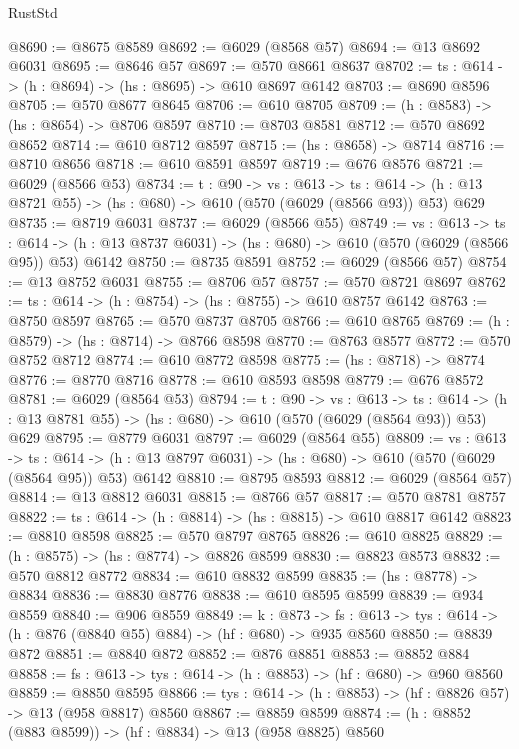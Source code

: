 \begin{lexlean}{RustStd}
\begin{coremodule}
@8690 := @8675 @8589
@8692 := @6029 (@8568 @57)
@8694 := @13 @8692 @6031
@8695 := @8646 @57
@8697 := @570 @8661 @8637
@8702 := {ts : @614} -> (h : @8694) -> (hs : @8695) -> @610 @8697 @6142
@8703 := @8690 @8596
@8705 := @570 @8677 @8645
@8706 := @610 @8705
@8709 := (h : @8583) -> (hs : @8654) -> @8706 @8597
@8710 := @8703 @8581
@8712 := @570 @8692 @8652
@8714 := @610 @8712 @8597
@8715 := (hs : @8658) -> @8714
@8716 := @8710 @8656
@8718 := @610 @8591 @8597
@8719 := @676 @8576
@8721 := @6029 (@8566 @53)
@8734 := {t : @90} ->
  {vs : @613} ->
  {ts : @614} -> (h : @13 @8721 @55) -> (hs : @680) -> @610 (@570 (@6029 (@8566 @93)) @53) @629
@8735 := @8719 @6031
@8737 := @6029 (@8566 @55)
@8749 := {vs : @613} ->
  {ts : @614} -> (h : @13 @8737 @6031) -> (hs : @680) -> @610 (@570 (@6029 (@8566 @95)) @53) @6142
@8750 := @8735 @8591
@8752 := @6029 (@8566 @57)
@8754 := @13 @8752 @6031
@8755 := @8706 @57
@8757 := @570 @8721 @8697
@8762 := {ts : @614} -> (h : @8754) -> (hs : @8755) -> @610 @8757 @6142
@8763 := @8750 @8597
@8765 := @570 @8737 @8705
@8766 := @610 @8765
@8769 := (h : @8579) -> (hs : @8714) -> @8766 @8598
@8770 := @8763 @8577
@8772 := @570 @8752 @8712
@8774 := @610 @8772 @8598
@8775 := (hs : @8718) -> @8774
@8776 := @8770 @8716
@8778 := @610 @8593 @8598
@8779 := @676 @8572
@8781 := @6029 (@8564 @53)
@8794 := {t : @90} ->
  {vs : @613} ->
  {ts : @614} -> (h : @13 @8781 @55) -> (hs : @680) -> @610 (@570 (@6029 (@8564 @93)) @53) @629
@8795 := @8779 @6031
@8797 := @6029 (@8564 @55)
@8809 := {vs : @613} ->
  {ts : @614} -> (h : @13 @8797 @6031) -> (hs : @680) -> @610 (@570 (@6029 (@8564 @95)) @53) @6142
@8810 := @8795 @8593
@8812 := @6029 (@8564 @57)
@8814 := @13 @8812 @6031
@8815 := @8766 @57
@8817 := @570 @8781 @8757
@8822 := {ts : @614} -> (h : @8814) -> (hs : @8815) -> @610 @8817 @6142
@8823 := @8810 @8598
@8825 := @570 @8797 @8765
@8826 := @610 @8825
@8829 := (h : @8575) -> (hs : @8774) -> @8826 @8599
@8830 := @8823 @8573
@8832 := @570 @8812 @8772
@8834 := @610 @8832 @8599
@8835 := (hs : @8778) -> @8834
@8836 := @8830 @8776
@8838 := @610 @8595 @8599
@8839 := @934 @8559
@8840 := @906 @8559
@8849 := {k : @873} ->
  {fs : @613} -> {tys : @614} -> (h : @876 (@8840 @55) @884) -> (hf : @680) -> @935 @8560
@8850 := @8839 @872
@8851 := @8840 @872
@8852 := @876 @8851
@8853 := @8852 @884
@8858 := {fs : @613} -> {tys : @614} -> (h : @8853) -> (hf : @680) -> @960 @8560
@8859 := @8850 @8595
@8866 := {tys : @614} -> (h : @8853) -> (hf : @8826 @57) -> @13 (@958 @8817) @8560
@8867 := @8859 @8599
@8874 := (h : @8852 (@883 @8599)) -> (hf : @8834) -> @13 (@958 @8825) @8560

\end{coremodule}
\end{lexlean}
